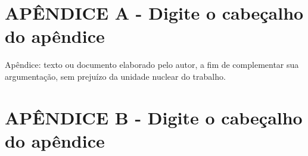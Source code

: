 \chapter*{\normalsize APÊNDICE A - Digite o cabeçalho do apêndice}

Apêndice: texto ou documento elaborado pelo autor, a fim de complementar sua argumentação, sem prejuízo da unidade nuclear do trabalho.

\chapter*{\normalsize APÊNDICE B - Digite o cabeçalho do apêndice}